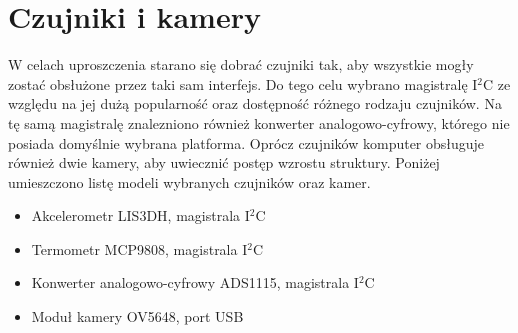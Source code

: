\section{Czujniki i kamery}

W celach uproszczenia starano się dobrać czujniki tak, aby wszystkie mogły zostać obsłużone przez taki sam interfejs. Do tego celu wybrano magistralę I$^2$C ze względu na jej dużą popularność oraz dostępność różnego rodzaju czujników. Na tę samą magistralę znalezniono również konwerter analogowo-cyfrowy, którego nie posiada domyślnie wybrana platforma. Oprócz czujników komputer obsługuje również dwie kamery, aby uwiecznić postęp wzrostu struktury. Poniżej umieszczono listę modeli wybranych czujników oraz kamer.
\begin{itemize}
	\item Akcelerometr LIS3DH, magistrala I$^2$C
	\item Termometr MCP9808, magistrala I$^2$C
	\item Konwerter analogowo-cyfrowy ADS1115, magistrala I$^2$C
	\item Moduł kamery OV5648, port USB
	
\end{itemize}


